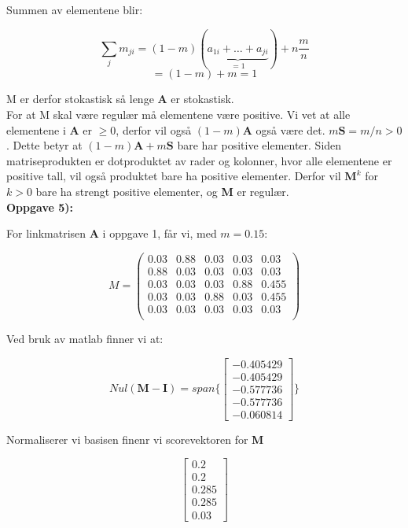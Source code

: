 \documentclass[a4paper,norsk,11pt,twoside]{article}
\begin{document}
Summen av elementene blir:

$$
\sum_j m_{ji} =  (1-m)(\underbrace{a_{1i} + \ldots + a_{ji}}_{=1}) + n\frac{m}{n}
$$
$$
= (1-m) + m = 1
$$

M er derfor stokastisk så lenge \textbf{A} er stokastisk.\\

For at M skal være regulær må elementene være positive. Vi vet at alle elementene i \textbf{A} er $\geq 0$, derfor vil også $(1-m)\textbf{A}$ også være det. $m\textbf{S} = m/n > 0$. Dette betyr at $(1-m)\textbf{A} + m\textbf{S}$ bare har positive elementer. Siden matriseprodukten er dotproduktet av rader og kolonner, hvor alle elementene er positive tall, vil også produktet bare ha positive elementer. Derfor vil $\textbf{M}^{k}$ for $k>0$ bare ha strengt positive elementer, og \textbf{M} er regulær.\\

\textbf{Oppgave 5):}

For linkmatrisen \textbf{A} i oppgave 1, får vi, med $m = 0.15$:

$$
M = 
\begin{pmatrix}
0.03 & 0.88 & 0.03 & 0.03 & 0.03\\
0.88 & 0.03 & 0.03 & 0.03 & 0.03\\
0.03 & 0.03 & 0.03 & 0.88 & 0.455\\
0.03 & 0.03 & 0.88 & 0.03 & 0.455\\
0.03 & 0.03 & 0.03 & 0.03 & 0.03\\
\end{pmatrix}
$$

Ved bruk av matlab finner vi at:

$$
Nul(\textbf{M} - \textbf{I}) = span\{ \begin{bmatrix}
-0.405429 \\ -0.405429 \\ -0.577736 \\ -0.577736 \\ -0.060814
\end{bmatrix} \}
$$

Normaliserer vi basisen finenr vi scorevektoren for \textbf{M}

$$
\begin{bmatrix}
0.2 \\ 0.2 \\ 0.285 \\ 0.285 \\ 0.03
\end{bmatrix}
$$\\
\end{document}

